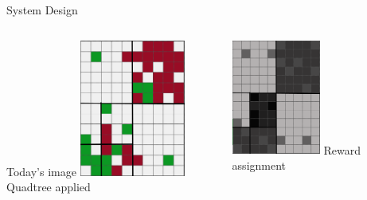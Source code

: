 \documentclass[9pt]{beamer}
\begin{document}
\begin{frame}{System Design}
\begin{columns}
\begin{column}{0.33\textwidth}
\begin{center}
                \newline
                Today's image
                \newline
                \includegraphics[width=0.50\textwidth,trim={0cm 0cm 0cm 0cm},clip]{img/analyst_grid.png}
                \newline
                Quadtree applied
            \end{center}
        \end{column}
        \begin{column}{0.33\textwidth}
                \includegraphics[width=0.50\textwidth,trim={0cm 0cm 0cm 0cm},clip]{img/analyst_grid_2.png}
                \newline
                Reward assignment
                \newline

\end{column}
\end{columns}
\end{frame}
\end{document}
